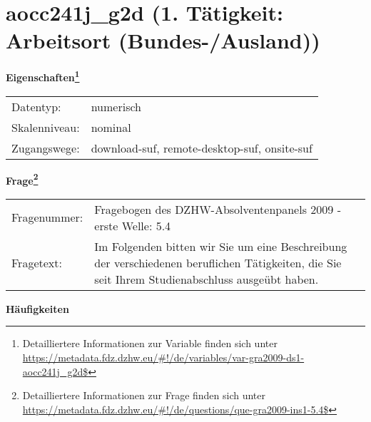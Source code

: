 
    \setcounter{footnote}{0}

    \vspace*{-1.8cm}
	\section{aocc241j\_g2d (1. Tätigkeit: Arbeitsort (Bundes-/Ausland))}
	\label{section:aocc241j_g2d}



    \vspace*{0.5cm}
    \noindent\textbf{Eigenschaften\footnote{Detailliertere Informationen zur Variable finden sich unter
		\url{https://metadata.fdz.dzhw.eu/\#!/de/variables/var-gra2009-ds1-aocc241j_g2d$}}}\\
	\begin{tabularx}{\hsize}{@{}lX}
	Datentyp: & numerisch \\
	Skalenniveau: & nominal \\
	Zugangswege: &
	  download-suf, 
	  remote-desktop-suf, 
	  onsite-suf
 \\
    \end{tabularx}



				\vspace*{0.5cm}
                \noindent\textbf{Frage\footnote{Detailliertere Informationen zur Frage finden sich unter
		              \url{https://metadata.fdz.dzhw.eu/\#!/de/questions/que-gra2009-ins1-5.4$}}}\\
				\begin{tabularx}{\hsize}{@{}lX}
					Fragenummer: &
					  Fragebogen des DZHW-Absolventenpanels 2009 - erste Welle:
					  5.4
 \\
					Fragetext: & Im Folgenden bitten wir Sie um eine Beschreibung der verschiedenen beruflichen Tätigkeiten, die Sie seit Ihrem Studienabschluss ausgeübt haben. \\
				\end{tabularx}





        		\vspace*{0.5cm}
                \noindent\textbf{Häufigkeiten}

